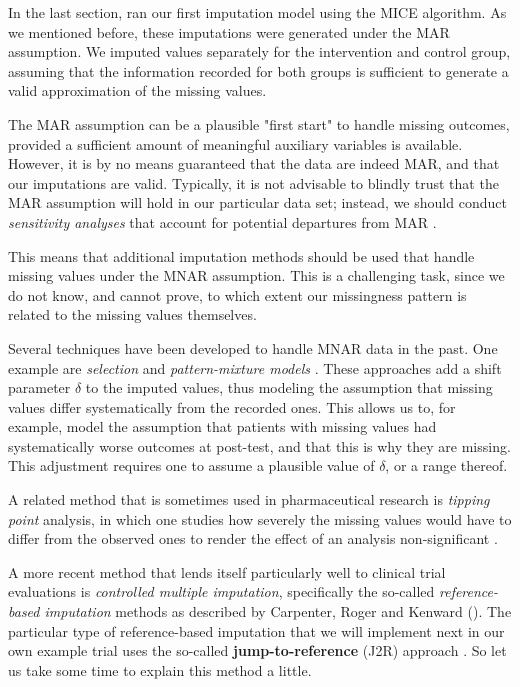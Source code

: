 In the last section, ran our first imputation model using the \textsf{MICE} algorithm. As we mentioned before, these imputations were generated under the MAR assumption. We imputed values separately for the intervention and control group, assuming that the information recorded for both groups is sufficient to generate a valid approximation of the missing values. 

The MAR assumption can be a plausible "first start" to handle missing outcomes, provided a sufficient amount of meaningful auxiliary variables is available. However, it is by no means guaranteed that the data are indeed MAR, and that our imputations are valid. Typically, it is not advisable to blindly trust that the MAR assumption will hold in our particular data set; instead, we should conduct \emph{sensitivity analyses} that account for potential departures from MAR \citep{tan2021review, cro2020sensitivity}. 

This means that additional imputation methods should be used that handle missing values under the MNAR assumption. This is a challenging task, since we do not know, and cannot prove, to which extent our missingness pattern is related to the missing values themselves. 

Several techniques have been developed to handle MNAR data in the past. One example are \emph{selection} \citep{little2014selection, heckman1979sample} and \emph{pattern-mixture models} \citep{thijs2002strategies, glynn1986selection}. These approaches add a shift parameter $\delta$ to the imputed values, thus modeling the assumption that missing values differ systematically from the recorded ones. This allows us to, for example, model the assumption that patients with missing values had systematically worse outcomes at post-test, and that this is why they are missing. This adjustment requires one to assume a plausible value of $\delta$, or a range thereof. 

A related method that is sometimes used in pharmaceutical research is \emph{tipping point} analysis, in which one studies how severely the missing values would have to differ from the observed ones to render the effect of an analysis non-significant \citep{liublinska2014sensitivity}. 

A more recent method that lends itself particularly well to clinical trial evaluations is \emph{controlled multiple imputation}, specifically the so-called \emph{reference-based imputation} methods as described by Carpenter, Roger and Kenward (\citeyear{carpenter2013analysis}). The particular type of reference-based imputation that we will implement next in our own example trial uses the so-called \textbf{jump-to-reference} (J2R) approach \citep{carpenter2013analysis, white2020causal}. So let us take some time to explain this method a little.

